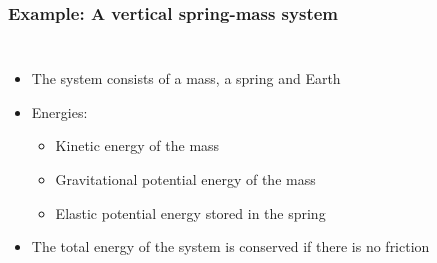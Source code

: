 \documentclass[12pt,compress,aspectratio=169]{beamer}
\begin{document}
\begin{frame}
  \frametitle{Example: A vertical spring-mass system}

  \begin{columns}
    \begin{itemize}
    \item The system consists of a mass, a spring and Earth
    \item Energies:
      \begin{itemize}
      \item Kinetic energy of the mass
      \item Gravitational potential energy of the mass
      \item Elastic potential energy stored in the spring
      \end{itemize}
    \item The total energy of the system is conserved if there is no friction
    \end{itemize}
  \end{columns}
\end{frame}
\end{document}
